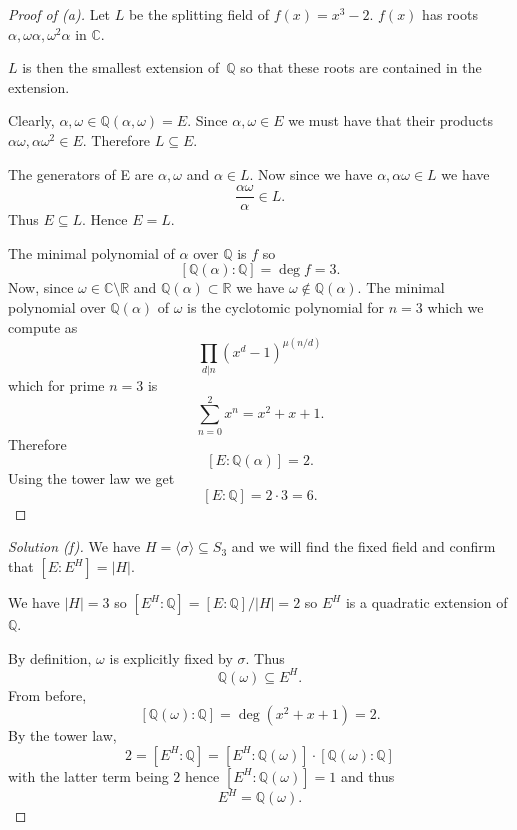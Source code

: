 \begin{proof}[Proof of (a)]
    Let $L$ be the splitting field of $f(x) = x^3 - 2$. 
    $f(x)$ has roots $\alpha, \omega \alpha, \omega^2\alpha$ in 
    $\mathbb C$. 

    $L$ is then the smallest extension of $\mathbb Q$ so that 
    these roots are contained in the extension.  

    Clearly, $\alpha, \omega \in \mathbb Q(\alpha, \omega) = E$. 
    Since $\alpha, \omega \in E$ we must have that their products 
    $\alpha \omega, \alpha\omega^2 \in E$. Therefore $L \subseteq E$. 

    The generators of E are $\alpha, \omega$ and 
    $\alpha \in L$. Now since we have $\alpha, \alpha\omega \in L$ we have 
    \[
        \frac{\alpha\omega}{\alpha} \in L.
    \]
    Thus $E \subseteq L$. Hence $E = L$. 

    The minimal polynomial of $\alpha$ over $\mathbb Q$ is 
    $f$ so 
    \[
        [\mathbb Q(\alpha) : \mathbb Q] = \deg f = 3. 
    \]
    Now, since $\omega \in \mathbb C \setminus \mathbb R$ and 
    $\mathbb Q(\alpha) \subset \mathbb R$ we have $\omega \not 
    \in \mathbb Q(\alpha)$. 
    The minimal polynomial over $\mathbb Q(\alpha)$ of 
    $\omega$ is the cyclotomic polynomial for $n = 3$ which 
    we compute as 
    \[
        \prod_{d|n}(x^d - 1)^{\mu(n/d)}
    \]
    which for prime $n = 3$ is 
    \[
        \sum_{n=0}^2 x^n = x^2 + x + 1.
    \]
    Therefore 
    \[
        [E : \mathbb Q(\alpha)] = 2.
    \]
    Using the tower law we get 
    \[
        [E:\mathbb Q] = 2 \cdot 3 = 6. 
    \]
\end{proof}
\begin{proof}[Solution (f)]
    We have $H = \langle \sigma \rangle \subseteq S_3$ and 
    we will find the fixed field and 
    confirm that $[E:E^H] = |H|$. 

    We have $|H| = 3$ so $[E^H:\mathbb Q] = [E:\mathbb Q] / |H| = 2$ so 
    $E^H$ is a quadratic extension of $\mathbb Q$.

    By definition, $\omega$ is explicitly fixed by $\sigma$. 
    Thus 
    \[
        \mathbb Q(\omega) \subseteq E^H.
    \]
    From before, 
    \[
        [\mathbb Q(\omega) : \mathbb Q] 
        = \deg(x^2 + x + 1) = 2.
    \] 
    By the tower law, 
    \[
        2 = [E^H : \mathbb Q]
        = [E^H : \mathbb Q(\omega)]\cdot [\mathbb Q(\omega) : \mathbb Q] 
    \]
    with the latter term being $2$ hence $[E^H : \mathbb Q(\omega)] = 1$ 
    and thus 
    \[
        E^H = \mathbb Q(\omega).
    \]
\end{proof}

